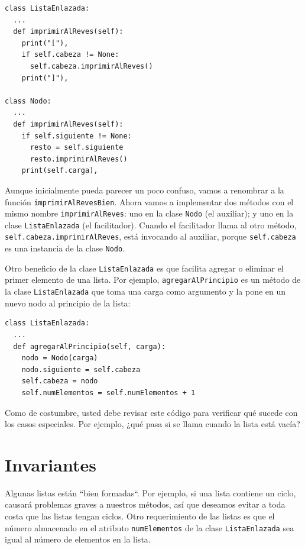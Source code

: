 \beforeverb 
\begin{verbatim}
class ListaEnlazada:
  ...
  def imprimirAlReves(self):
    print("["),
    if self.cabeza != None:
      self.cabeza.imprimirAlReves()
    print("]"),

class Nodo:
  ...
  def imprimirAlReves(self):
    if self.siguiente != None:
      resto = self.siguiente
      resto.imprimirAlReves()
    print(self.carga),
\end{verbatim}
\afterverb Aunque inicialmente pueda parecer un poco confuso, vamos
a renombrar a la función \texttt{imprimirAlRevesBien}. Ahora vamos
a implementar dos métodos con el mismo nombre \texttt{imprimirAlReves}:
uno en la clase \texttt{Nodo} (el auxiliar); y uno en la clase \texttt{ListaEnlazada}
(el facilitador). Cuando el facilitador llama al otro método, \texttt{self.cabeza.imprimirAlReves},
está invocando al auxiliar, porque \texttt{self.cabeza} es una instancia
de la clase \texttt{Nodo}.

Otro beneficio de la clase \texttt{ListaEnlazada} es que facilita
agregar o eliminar el primer elemento de una lista. Por ejemplo, \texttt{agregarAlPrincipio}
es un método de la clase \texttt{ListaEnlazada} que toma una carga
como argumento y la pone en un nuevo nodo al principio de la lista:

\beforeverb 
\begin{verbatim}
class ListaEnlazada:
  ...
  def agregarAlPrincipio(self, carga):
    nodo = Nodo(carga)
    nodo.siguiente = self.cabeza
    self.cabeza = nodo
    self.numElementos = self.numElementos + 1
\end{verbatim}
\afterverb Como de costumbre, usted debe revisar este código para
verificar qué sucede con los casos especiales. Por ejemplo, ¿qué pasa
si se llama cuando la lista está vacía?

\section{Invariantes}

  

Algunas listas están ``bien formadas``. Por ejemplo,
si una lista contiene un ciclo, causará problemas graves a nuestros
métodos, así que deseamos evitar a toda costa que las listas tengan
ciclos. Otro requerimiento de las listas es que el número almacenado
en el atributo \texttt{numElementos} de la clase \texttt{ListaEnlazada}
sea igual al número de elementos en la lista.

